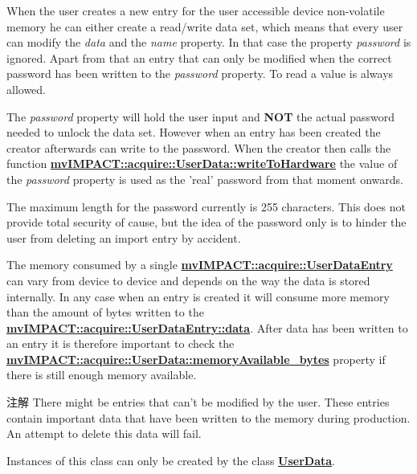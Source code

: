 When the user creates a new entry for the user accessible device non-\/volatile memory he can either create a read/write data set, which means that every user can modify the {\itshape data} and the {\itshape name} property. In that case the property {\itshape password} is ignored. Apart from that an entry that can only be modified when the correct password has been written to the {\itshape password} property. To read a value is always allowed.

The {\itshape password} property will hold the user input and {\bfseries N\+O\+T} the actual password needed to unlock the data set. However when an entry has been created the creator afterwards can write to the password. When the creator then calls the function {\bfseries \hyperlink{classmv_i_m_p_a_c_t_1_1acquire_1_1_user_data_ae6e2e87a923281c6a821b0f221b968b8}{mv\+I\+M\+P\+A\+C\+T\+::acquire\+::\+User\+Data\+::write\+To\+Hardware}} the value of the {\itshape password} property is used as the 'real' password from that moment onwards.

The maximum length for the password currently is 255 characters. This does not provide total security of cause, but the idea of the password only is to hinder the user from deleting an import entry by accident.

The memory consumed by a single {\bfseries \hyperlink{classmv_i_m_p_a_c_t_1_1acquire_1_1_user_data_entry}{mv\+I\+M\+P\+A\+C\+T\+::acquire\+::\+User\+Data\+Entry}} can vary from device to device and depends on the way the data is stored internally. In any case when an entry is created it will consume more memory than the amount of bytes written to the {\bfseries \hyperlink{classmv_i_m_p_a_c_t_1_1acquire_1_1_user_data_entry_a3dfca06b8c8b7368fd36382ddf95ac46}{mv\+I\+M\+P\+A\+C\+T\+::acquire\+::\+User\+Data\+Entry\+::data}}. After data has been written to an entry it is therefore important to check the {\bfseries \hyperlink{classmv_i_m_p_a_c_t_1_1acquire_1_1_user_data_a73d926fc65fbae2a8b78016744c20be8}{mv\+I\+M\+P\+A\+C\+T\+::acquire\+::\+User\+Data\+::memory\+Available\+\_\+bytes}} property if there is still enough memory available.

\begin{DoxyNote}{注解}
There might be entries that can't be modified by the user. These entries contain important data that have been written to the memory during production. An attempt to delete this data will fail.

Instances of this class can only be created by the class {\bfseries \hyperlink{classmv_i_m_p_a_c_t_1_1acquire_1_1_user_data}{User\+Data}}. 
\end{DoxyNote}



